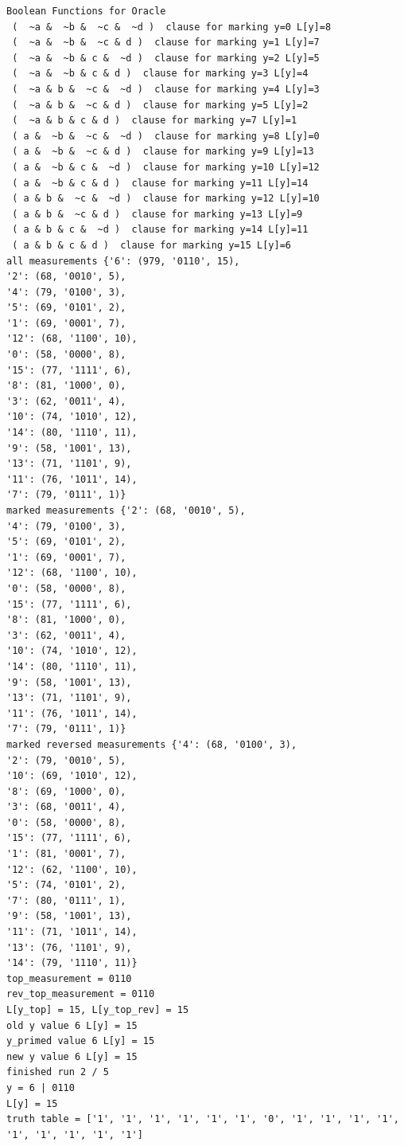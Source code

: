 \documentclass[11pt]{article}
\begin{document}
\begin{verbatim}
Boolean Functions for Oracle
 (  ~a &  ~b &  ~c &  ~d )  clause for marking y=0 L[y]=8
 (  ~a &  ~b &  ~c & d )  clause for marking y=1 L[y]=7
 (  ~a &  ~b & c &  ~d )  clause for marking y=2 L[y]=5
 (  ~a &  ~b & c & d )  clause for marking y=3 L[y]=4
 (  ~a & b &  ~c &  ~d )  clause for marking y=4 L[y]=3
 (  ~a & b &  ~c & d )  clause for marking y=5 L[y]=2
 (  ~a & b & c & d )  clause for marking y=7 L[y]=1
 ( a &  ~b &  ~c &  ~d )  clause for marking y=8 L[y]=0
 ( a &  ~b &  ~c & d )  clause for marking y=9 L[y]=13
 ( a &  ~b & c &  ~d )  clause for marking y=10 L[y]=12
 ( a &  ~b & c & d )  clause for marking y=11 L[y]=14
 ( a & b &  ~c &  ~d )  clause for marking y=12 L[y]=10
 ( a & b &  ~c & d )  clause for marking y=13 L[y]=9
 ( a & b & c &  ~d )  clause for marking y=14 L[y]=11
 ( a & b & c & d )  clause for marking y=15 L[y]=6
all measurements {'6': (979, '0110', 15), 
'2': (68, '0010', 5), 
'4': (79, '0100', 3), 
'5': (69, '0101', 2), 
'1': (69, '0001', 7), 
'12': (68, '1100', 10), 
'0': (58, '0000', 8), 
'15': (77, '1111', 6), 
'8': (81, '1000', 0), 
'3': (62, '0011', 4), 
'10': (74, '1010', 12), 
'14': (80, '1110', 11), 
'9': (58, '1001', 13), 
'13': (71, '1101', 9), 
'11': (76, '1011', 14), 
'7': (79, '0111', 1)}
marked measurements {'2': (68, '0010', 5), 
'4': (79, '0100', 3), 
'5': (69, '0101', 2), 
'1': (69, '0001', 7), 
'12': (68, '1100', 10), 
'0': (58, '0000', 8), 
'15': (77, '1111', 6), 
'8': (81, '1000', 0), 
'3': (62, '0011', 4), 
'10': (74, '1010', 12), 
'14': (80, '1110', 11), 
'9': (58, '1001', 13), 
'13': (71, '1101', 9), 
'11': (76, '1011', 14), 
'7': (79, '0111', 1)}
marked reversed measurements {'4': (68, '0100', 3), 
'2': (79, '0010', 5), 
'10': (69, '1010', 12), 
'8': (69, '1000', 0), 
'3': (68, '0011', 4), 
'0': (58, '0000', 8), 
'15': (77, '1111', 6), 
'1': (81, '0001', 7), 
'12': (62, '1100', 10), 
'5': (74, '0101', 2), 
'7': (80, '0111', 1), 
'9': (58, '1001', 13), 
'11': (71, '1011', 14), 
'13': (76, '1101', 9), 
'14': (79, '1110', 11)}
top_measurement = 0110
rev_top_measurement = 0110
L[y_top] = 15, L[y_top_rev] = 15
old y value 6 L[y] = 15
y_primed value 6 L[y] = 15
new y value 6 L[y] = 15
finished run 2 / 5
y = 6 | 0110
L[y] = 15
truth table = ['1', '1', '1', '1', '1', '1', '0', '1', '1', '1', '1', '1', '1', '1', '1', '1']


\end{verbatim}
\end{document}
